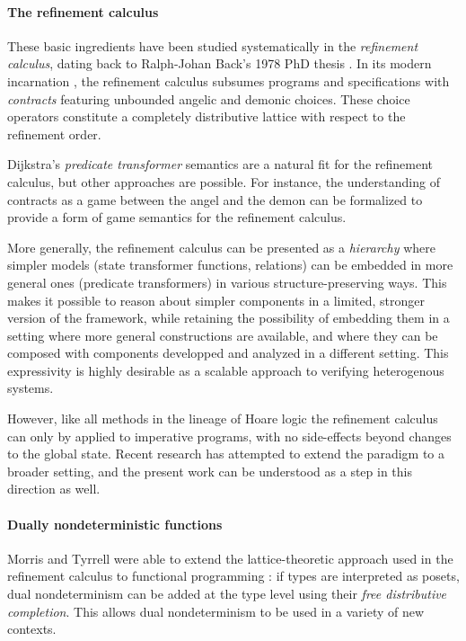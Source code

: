 \documentclass[sigplan,10pt,review,anonymous]{acmart}
\begin{document}
\paragraph{The refinement calculus} %

These basic ingredients have been studied systematically
in the \emph{refinement calculus},
dating back to Ralph-Johan Back's 1978 PhD thesis \cite{backthesis}.
In its modern incarnation \cite{refcal},
the refinement calculus
subsumes programs and specifications with \emph{contracts}
featuring unbounded angelic and demonic choices.
These choice operators
constitute a completely distributive lattice
with respect to the refinement order.

Dijkstra's \emph{predicate transformer} semantics \cite{gc}
are a natural fit for the refinement calculus,
but other approaches are possible.
For instance,
the understanding of contracts as a game between
the angel and the demon
can be formalized to provide a form of
game semantics for the refinement calculus.

More generally,
the refinement calculus can be presented as a \emph{hierarchy}
where simpler models (state transformer functions, relations)
can be embedded in more general ones (predicate transformers)
in various structure-preserving ways.
This makes it possible to reason about simpler components
in a limited, stronger version of the framework,
while retaining the possibility of embedding them
in a setting
where more general constructions are available,
and where they can be composed with components
developped and analyzed in a different setting.
This expressivity is highly desirable
as a scalable approach to
verifying heterogenous systems.

However,
like all methods in the lineage of Hoare logic
the refinement calculus can only by applied to imperative programs,
with no side-effects beyond changes to the global state.
Recent research has attempted to extend the paradigm
to a broader setting,
and the present work can be understood
as a step in this direction as well.


\paragraph{Dually nondeterministic functions} %

Morris and Tyrrell were able to extend
the lattice-theoretic approach used in the refinement calculus
to functional programming
\cite{augtyp,dndf,cspdnd}:
if types are interpreted as posets,
dual nondeterminism can be added at the type level
using their \emph{free distributive completion}.
This allows dual nondeterminism to be used
in a variety of new contexts.
\end{document}
